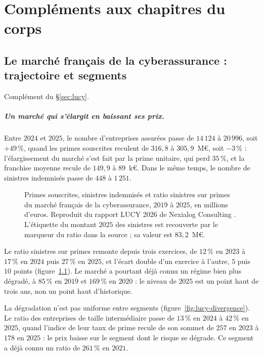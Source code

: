 \chapter{Compléments aux chapitres du corps}
\label{chap:complements}

\section{Le marché français de la cyberassurance : trajectoire et segments}
\label{sec:ann-lucy}


Complément du \S\ref{sec:lucy}.

\paragraph{Un marché qui s'élargit en baissant ses prix.} Entre $2024$ et $2025$, le nombre
d'entreprises assurées passe de $14\,124$ à $20\,996$, soit $+49\,\%$, quand les primes
souscrites reculent de $316{,}8$ à $305{,}9$~M\euro, soit $-3\,\%$ : l'élargissement du marché
s'est fait par la prime unitaire, qui perd $35\,\%$, et la franchise moyenne recule de
$149{,}9$ à $89$~k\euro. Dans le même temps, le nombre de sinistres indemnisés passe de $448$ à
$1\,251$.

\begin{figure}[htbp]
\centering
{}
\caption[Primes, sinistres et ratio du marché français de la cyberassurance]{Primes souscrites,
sinistres indemnisés et ratio sinistres sur primes du marché français de la cyberassurance,
$2019$ à $2025$, en millions d'euros. Reproduit du rapport LUCY 2026 de Nexialog Consulting
\citep{RapiorKaddouri2026}. L'étiquette du montant $2025$ des sinistres est recouverte par le
marqueur du ratio dans la source ; sa valeur est $83{,}2$~M\euro.}
\label{fig:lucy-sp}
\end{figure}

\noindent Le ratio sinistres sur primes remonte depuis trois exercices, de $12\,\%$ en $2023$ à
$17\,\%$ en $2024$ puis $27\,\%$ en $2025$, et l'écart double d'un exercice à l'autre, $5$ puis
$10$ points (figure~\ref{fig:lucy-sp}). Le marché a pourtant déjà connu un régime bien plus
dégradé, à $85\,\%$ en $2019$ et $169\,\%$ en $2020$ : le niveau de $2025$ est un point haut de
trois ans, non un point haut d'historique.

\noindent La dégradation n'est pas uniforme entre segments (figure~\ref{fig:lucy-divergence}). Le
ratio des entreprises de taille intermédiaire passe de $13\,\%$ en $2024$ à $42\,\%$ en $2025$,
quand l'indice de leur taux de prime recule de son sommet de $257$ en $2023$ à $178$ en $2025$ :
le prix baisse sur le segment dont le risque se dégrade. Ce segment a déjà connu un ratio de
$261\,\%$ en $2021$.

